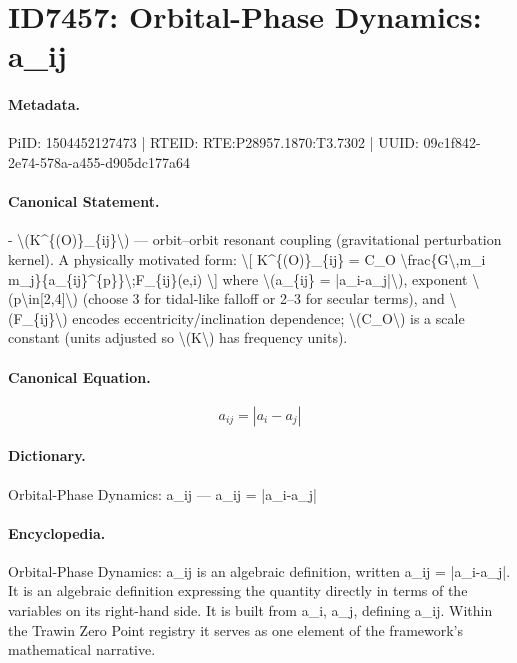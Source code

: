 \section*{ID7457: Orbital-Phase Dynamics: a\_ij}
\paragraph{Metadata.}
PiID: 1504452127473 | RTEID: RTE:P28957.1870:T3.7302 | UUID: 09c1f842-2e74-578a-a455-d905dc177a64

\paragraph{Canonical Statement.}
- \textbackslash{}(K\textasciicircum{}\{(O)\}\_\{ij\}\textbackslash{}) — orbit–orbit resonant coupling (gravitational perturbation kernel). A physically motivated form: \textbackslash{}[ K\textasciicircum{}\{(O)\}\_\{ij\} = C\_O \textbackslash{}frac\{G\textbackslash{},m\_i m\_j\}\{a\_\{ij\}\textasciicircum{}\{p\}\}\textbackslash{};F\_\{ij\}(e,i) \textbackslash{}] where \textbackslash{}(a\_\{ij\} = |a\_i-a\_j|\textbackslash{}), exponent \textbackslash{}(p\textbackslash{}in[2,4]\textbackslash{}) (choose 3 for tidal-like falloff or 2–3 for secular terms), and \textbackslash{}(F\_\{ij\}\textbackslash{}) encodes eccentricity/inclination dependence; \textbackslash{}(C\_O\textbackslash{}) is a scale constant (units adjusted so \textbackslash{}(K\textbackslash{}) has frequency units).

\paragraph{Canonical Equation.}
\[
a_{ij} = |a_i-a_j|
\]

\paragraph{Dictionary.}
Orbital-Phase Dynamics: a\_ij — a\_ij = |a\_i-a\_j|

\paragraph{Encyclopedia.}
Orbital-Phase Dynamics: a\_ij is an algebraic definition, written a\_ij = |a\_i-a\_j|. It is an algebraic definition expressing the quantity directly in terms of the variables on its right-hand side. It is built from a\_i, a\_j, defining a\_ij. Within the Trawin Zero Point registry it serves as one element of the framework's mathematical narrative.
